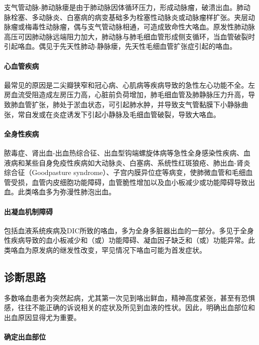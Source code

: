 支气管动脉-肺动脉瘘是由于肺动脉因体循环压力，形成动脉瘤，破溃出血。肺动脉栓塞、多动脉炎、白塞病的病变基础多为栓塞性动脉炎或动脉瘤样扩张。夹层动脉瘤或梅毒性动脉瘤，偶与支气管动脉相通，可造成致命性大咯血。原发性肺动脉高压可因肺动脉远端阻力加大，肺动脉与肺毛细血管形成侧支循环，当血管破裂时引起咯血。偶见于先天性肺动-静脉瘘，先天性毛细血管扩张症引起的咯血。

\paragraph{心血管疾病}

最常见的原因是二尖瓣狭窄和冠心病、心肌病等疾病导致的急性左心功能不全。左房血流受阻造成左房压力高，心脏前负荷增加，肺毛细血管及肺静脉压力升高，导致肺血管扩张，肺处于淤血状态，可引起肺水肿，并导致支气管黏膜下小静脉曲张，常自发或在炎症诱发下引起小静脉及毛细血管破裂，导致大咯血。

\paragraph{全身性疾病}

脓毒症、肾出血-出血热综合征、出血型钩端螺旋体病等急性全身感染性疾病、血液病和某些自身免疫性疾病如大动脉炎、白塞病、系统性红斑狼疮、肺出血-肾炎综合征（Goodpasture
syndrome）、子宫内膜异位症等病变，使肺微血管和毛细血管受损，血管内皮细胞功能障碍，血管脆性增加以及血小板减少或功能障碍导致出血。此类咯血多为弥漫性肺泡出血。

\paragraph{出凝血机制障碍}

包括血液系统疾病及DIC所致的咯血，多为全身多脏器出血的一部分。多见于全身性疾病导致的血小板减少和（或）功能障碍、凝血因子缺乏和（或）功能异常。此类咯血为原发病的继发性改变，罕见情况下咯血可能为首发症状。

\subsection{诊断思路}

多数咯血患者为突然起病，尤其第一次见到咯出鲜血，精神高度紧张，甚至有恐惧感，往往不能正确的诉说相关的症状及所见到血液的性状。因此，明确出血部位和出血原因显得尤为重要。

\paragraph{确定出血部位}

